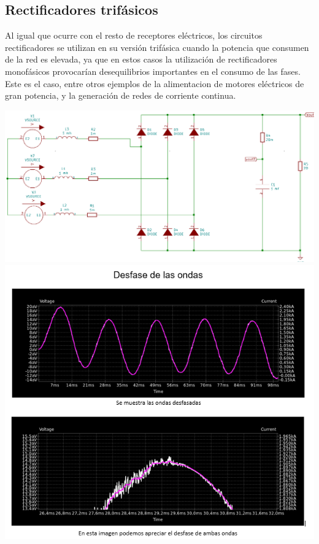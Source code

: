 \documentclass[12pt,a4paper]{article}
\begin{document}
\subsection{Rectificadores trifásicos}
\begin{flushleft}
Al igual que ocurre con el resto de receptores eléctricos, los circuitos rectificadores se utilizan en su versión trifásica cuando la potencia que consumen de la red es elevada, ya que en estos casos la utilización de rectificadores monofásicos provocarían desequilibrios importantes en el consumo de las fases. Este es el caso, entre otros ejemplos de la alimentacion de motores eléctricos de gran potencia, y la generación de redes de corriente continua.\\
\begin{center}
\includegraphics[scale=0.6]{imagenes/p6/Circuito6.png} 
\\
\includegraphics[scale=1]{imagenes/p6/desfase.PNG} 
\end{center}
\end{flushleft}
\newpage
\end{document}
